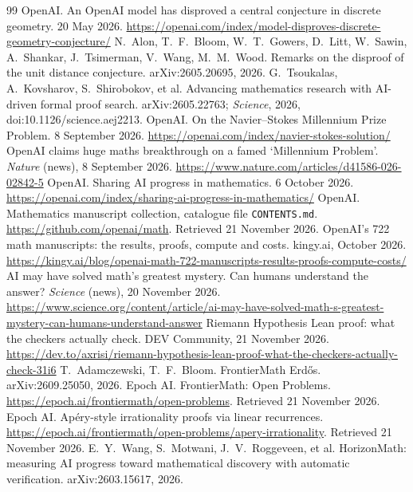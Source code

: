 \documentclass[11pt,a4paper]{article}
\theoremstyle{prob}
\begin{document}
\begingroup
\small
\begin{thebibliography}{99}\setlength{\itemsep}{1pt}
 OpenAI. An OpenAI model has disproved a central conjecture in discrete geometry. 20 May 2026. \url{https://openai.com/index/model-disproves-discrete-geometry-conjecture/}
 N.~Alon, T.~F.~Bloom, W.~T.~Gowers, D.~Litt, W.~Sawin, A.~Shankar, J.~Tsimerman, V.~Wang, M.~M.~Wood. Remarks on the disproof of the unit distance conjecture. arXiv:2605.20695, 2026.
 G.~Tsoukalas, A.~Kovsharov, S.~Shirobokov, et al. Advancing mathematics research with AI-driven formal proof search. arXiv:2605.22763; \emph{Science}, 2026, doi:10.1126/science.aej2213.
 OpenAI. On the Navier--Stokes Millennium Prize Problem. 8 September 2026. \url{https://openai.com/index/navier-stokes-solution/}
 OpenAI claims huge maths breakthrough on a famed `Millennium Problem'. \emph{Nature} (news), 8 September 2026. \url{https://www.nature.com/articles/d41586-026-02842-5}
 OpenAI. Sharing AI progress in mathematics. 6 October 2026. \url{https://openai.com/index/sharing-ai-progress-in-mathematics/}
 OpenAI. Mathematics manuscript collection, catalogue file \texttt{CONTENTS.md}. \url{https://github.com/openai/math}. Retrieved 21 November 2026.
 OpenAI's 722 math manuscripts: the results, proofs, compute and costs. kingy.ai, October 2026. \url{https://kingy.ai/blog/openai-math-722-manuscripts-results-proofs-compute-costs/}
 AI may have solved math's greatest mystery. Can humans understand the answer? \emph{Science} (news), 20 November 2026. \url{https://www.science.org/content/article/ai-may-have-solved-math-s-greatest-mystery-can-humans-understand-answer}
 Riemann Hypothesis Lean proof: what the checkers actually check. DEV Community, 21 November 2026. \url{https://dev.to/axrisi/riemann-hypothesis-lean-proof-what-the-checkers-actually-check-31i6}
 T.~Adamczewski, T.~F.~Bloom. FrontierMath Erd\H{o}s. arXiv:2609.25050, 2026.
 Epoch AI. FrontierMath: Open Problems. \url{https://epoch.ai/frontiermath/open-problems}. Retrieved 21 November 2026.
 Epoch AI. Ap\'ery-style irrationality proofs via linear recurrences. \url{https://epoch.ai/frontiermath/open-problems/apery-irrationality}. Retrieved 21 November 2026.
 E.~Y.~Wang, S.~Motwani, J.~V.~Roggeveen, et al. HorizonMath: measuring AI progress toward mathematical discovery with automatic verification. arXiv:2603.15617, 2026.

\end{thebibliography}
\end{document}
